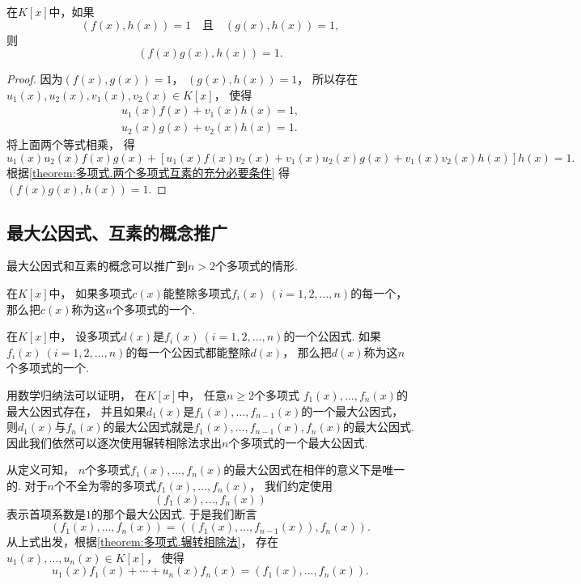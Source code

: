 \begin{property}
在\(K[x]\)中，如果\[
	(f(x),h(x))=1
	\quad\text{且}\quad
	(g(x),h(x))=1,
\]
则\[
	(f(x) g(x),h(x))=1.
\]
\begin{proof}
因为\((f(x),g(x))=1\)，
\((g(x),h(x))=1\)，
所以存在\(u_1(x),u_2(x),v_1(x),v_2(x) \in K[x]\)，
使得\begin{gather*}
	u_1(x) f(x) + v_1(x) h(x) = 1, \\
	u_2(x) g(x) + v_2(x) h(x) = 1.
\end{gather*}
将上面两个等式相乘，
得\[
	u_1(x) u_2(x) f(x) g(x)
	+ [
		u_1(x) f(x) v_2(x)
		+ v_1(x) u_2(x) g(x)
		+ v_1(x) v_2(x) h(x)
	] h(x)
	= 1.
\]
根据\cref{theorem:多项式.两个多项式互素的充分必要条件}
得\((f(x) g(x),h(x))=1\).
\end{proof}
\end{property}

\subsection{最大公因式、互素的概念推广}
最大公因式和互素的概念可以推广到\(n>2\)个多项式的情形.
\begin{definition}
在\(K[x]\)中，
如果多项式\(c(x)\)能整除多项式\(f_i(x)\ (i=1,2,\dotsc,n)\)的每一个，
那么把\(c(x)\)称为这\(n\)个多项式的一个.
\end{definition}

\begin{definition}
在\(K[x]\)中，
设多项式\(d(x)\)是\(f_i(x)\ (i=1,2,\dotsc,n)\)的一个公因式.
如果\(f_i(x)\ (i=1,2,\dotsc,n)\)的每一个公因式都能整除\(d(x)\)，
那么把\(d(x)\)称为这\(n\)个多项式的一个.
\end{definition}

用数学归纳法可以证明，
在\(K[x]\)中，
任意\(n\geq2\)个多项式
\(f_1(x),\dotsc,f_n(x)\)的最大公因式存在，
并且如果\(d_1(x)\)是\(f_1(x),\dotsc,f_{n-1}(x)\)的一个最大公因式，
则\(d_1(x)\)与\(f_n(x)\)的最大公因式就是\(f_1(x),\dotsc,f_{n-1}(x),f_n(x)\)的最大公因式.
因此我们依然可以逐次使用辗转相除法求出\(n\)个多项式的一个最大公因式.

从定义可知，
\(n\)个多项式\(f_1(x),\dotsc,f_n(x)\)的最大公因式在相伴的意义下是唯一的.
对于\(n\)个不全为零的多项式\(f_1(x),\dotsc,f_n(x)\)，
我们约定使用\[
	(f_1(x),\dotsc,f_n(x))
\]表示首项系数是\(1\)的那个最大公因式.
于是我们断言\[
	(f_1(x),\dotsc,f_n(x))
	= ((f_1(x),\dotsc,f_{n-1}(x)),f_n(x)).
\]
从上式出发，根据\cref{theorem:多项式.辗转相除法}，
存在\(u_1(x),\dotsc,u_n(x) \in K[x]\)，
使得\[
	u_1(x) f_1(x) + \dotsb + u_n(x) f_n(x)
	= (f_1(x),\dotsc,f_n(x)).
\]

